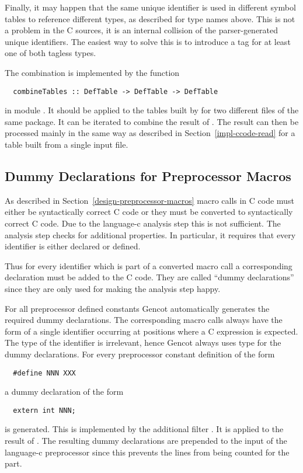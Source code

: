 Finally, it may happen that the same unique identifier is used in different symbol tables to reference different types, 
as described for type names above. This is not a problem in the C sources, it is an internal collision of the parser-generated 
unique identifiers. The easiest way to solve this is to introduce a tag for at least one of both tagless types.

The combination is implemented by the function
\begin{verbatim}
  combineTables :: DefTable -> DefTable -> DefTable
\end{verbatim}
in module . It should be applied to the tables built by  for two different
 files of the same package. It can be iterated to combine the result of .
The result can then be processed mainly in the same way as described in 
Section~\ref{impl-ccode-read} for a table built from a single input file.

\subsection{Dummy Declarations for Preprocessor Macros}
\label{impl-ccode-dummydecl}

As described in Section~\ref{design-preprocessor-macros} macro calls in C code must either be syntactically correct
C code or they must be converted to syntactically correct C code. Due to the language-c analysis step this is not 
sufficient. The analysis step checks for additional properties. In particular, it requires that every identifier 
is either declared or defined.

Thus for every identifier which is part of a converted macro call a corresponding declaration must be added to the 
C code. They are called ``dummy declarations'' since they are only used for making the analysis step happy. 

For all preprocessor defined constants Gencot automatically generates the required dummy declarations. The corresponding
macro calls always have the form of a single identifier occurring at positions where a C expression is expected. The type
of the identifier is irrelevant, hence Gencot always uses type  for the dummy declarations. For every preprocessor
constant definition of the form 
\begin{verbatim}
  #define NNN XXX
\end{verbatim}
a dummy declaration of the form
\begin{verbatim}
  extern int NNN;
\end{verbatim}
is generated. This is implemented by the additional filter . It is applied to the result of 
. The resulting dummy declarations are prepended to the input of the language-c preprocessor
since this prevents the lines from being counted for the  part.


